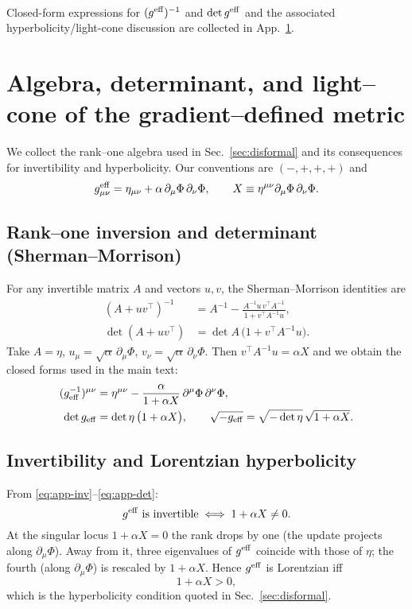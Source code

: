 \documentclass{article}
\begin{document}
\paragraph{}
Closed-form expressions for $(g^{\rm eff})^{-1}$ and $\det g^{\rm eff}$ and the associated hyperbolicity/light-cone discussion are collected in App.~\ref{app:algebra-hyper}.
\section{Algebra, determinant, and light--cone of the gradient--defined metric}
\label{app:algebra-hyper}

We collect the rank--one algebra used in Sec.~\ref{sec:disformal} and its consequences for invertibility and hyperbolicity. Our conventions are $(-,+,+,+)$ and
\[
g^{\rm eff}_{\mu\nu}=\eta_{\mu\nu}+\alpha\,\partial_\mu\Phi\,\partial_\nu\Phi,
\qquad
X\equiv \eta^{\mu\nu}\partial_\mu\Phi\,\partial_\nu\Phi.
\]

\subsection{Rank--one inversion and determinant (Sherman--Morrison)}
\label{app:SM}
For any invertible matrix $A$ and vectors $u,v$, the Sherman--Morrison identities are
\begin{align}
(A+u v^\top)^{-1} &= A^{-1} - \frac{A^{-1}u\,v^\top A^{-1}}{\,1+v^\top A^{-1}u\,}, \label{eq:SM-inv}\\
\det(A+u v^\top) &= \det A \,\big(1+v^\top A^{-1}u\big). \label{eq:SM-det}
\end{align}
Take $A=\eta$, $u_\mu=\sqrt{\alpha}\,\partial_\mu\Phi$, $v_\nu=\sqrt{\alpha}\,\partial_\nu\Phi$. Then
$v^\top A^{-1}u=\alpha X$ and we obtain the closed forms used in the main text:
\begin{align}
(g_{\rm eff}^{-1})^{\mu\nu}
&=\eta^{\mu\nu}-\frac{\alpha}{1+\alpha X}\,\partial^\mu\Phi\,\partial^\nu\Phi,
\label{eq:app-inv}\\
\det g_{\rm eff}
&=\det\eta\,\big(1+\alpha X\big),
\qquad
\sqrt{-g_{\rm eff}}=\sqrt{-\det\eta}\,\sqrt{1+\alpha X}.
\label{eq:app-det}
\end{align}

\subsection{Invertibility and Lorentzian hyperbolicity}
\label{app:invert}
From \eqref{eq:app-inv}–\eqref{eq:app-det}:
\[
g^{\rm eff}\ \text{is invertible} \iff 1+\alpha X\neq 0.
\]
At the singular locus $1+\alpha X=0$ the rank drops by one (the update projects along $\partial_\mu\Phi$). Away from it, three eigenvalues of $g^{\rm eff}$ coincide with those of $\eta$; the fourth (along $\partial_\mu\Phi$) is rescaled by $1+\alpha X$. Hence $g^{\rm eff}$ is Lorentzian iff
\begin{equation}
1+\alpha X>0,
\label{eq:lorentz-band-app}
\end{equation}
which is the hyperbolicity condition quoted in Sec.~\ref{sec:disformal}.
\end{document}

